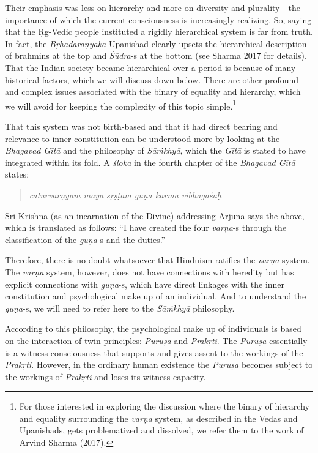 Their emphasis was less on hierarchy and more on diversity and plurality—the importance of which the current consciousness is increasingly realizing. So, saying that the Ṛg-Vedic people instituted a rigidly hierarchical system is far from truth. In fact, the \textit{Bṛhadāraṇyaka} Upanishad clearly upsets the hierarchical description of brahmins at the top and \textit{Śūdra}-s at the bottom (see Sharma 2017 for details). That the Indian society became hierarchical over a period is because of many historical factors, which we will discuss down below. There are other profound and complex issues associated with the binary of equality and hierarchy, which we will avoid for keeping the complexity of this topic simple.\footnote{For those interested in exploring the discussion where the binary of hierarchy and equality surrounding the \textit{varṇa} 	system, as described in the Vedas and Upanishads, gets problematized and dissolved, we refer them to the work of Arvind Sharma (2017).}

That this system was not birth-based and that it had direct bearing and relevance to inner constitution can be understood more by looking at the \textit{Bhagavad Gītā} and the philosophy of \textit{Sāṁkhyā}, which the \textit{Gītā} is stated to have integrated within its fold. A \textit{śloka} in the fourth chapter of the \textit{Bhagavad Gītā} states:
\begin{quote}
\textit{cāturvarṇyam mayā sṛṣṭam guṇa karma vibhāgaśaḥ} 
\end{quote}
Sri Krishna (as an incarnation of the Divine) addressing Arjuna says the above, which is translated as follows: “I have created the four \textit{varṇa}-s through the classification of the \textit{guṇa}-s and the duties.”

Therefore, there is no doubt whatsoever that Hinduism ratifies the \textit{varṇa} system. The \textit{varṇa} system, however, does not have connections with heredity but has explicit connections with \textit{guṇa}-s,  which have direct linkages with the inner constitution and psychological make up of an individual. And to understand the \textit{guṇa}-s,  we will need to refer here to the \textit{Sāṁkhyā} philosophy. 

According to this philosophy, the psychological make up of individuals is based on the interaction of twin principles: \textit{Puruṣa} and \textit{Prakṛti}. The \textit{Puruṣa} essentially is a witness consciousness that supports and gives assent to the workings of the \textit{Prakṛti}. However, in the ordinary human existence the \textit{Puruṣa} becomes subject to the workings of \textit{Prakṛti} and loses its witness capacity. 

